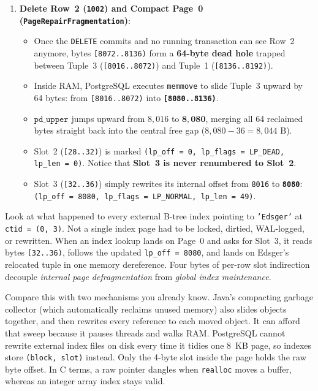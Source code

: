 \begin{enumerate}
  \item \textbf{Delete Row~2 (\texttt{1002}) and Compact Page~0 (\texttt{PageRepairFragmentation})}:
  \begin{itemize}
    \item Once the \texttt{DELETE} commits and no running transaction can see Row~2 anymore, bytes \texttt{[8072..8136)} form a \textbf{64-byte dead hole} trapped between Tuple~3 (\texttt{[8016..8072)}) and Tuple~1 (\texttt{[8136..8192)}).
    \item Inside RAM, PostgreSQL executes \texttt{memmove} to slide Tuple~3 upward by 64 bytes: from \texttt{[8016..8072)} into \textbf{\texttt{[8080..8136)}}.
    \item $\texttt{pd\_upper}$ jumps upward from $8{,}016$ to $\mathbf{8{,}080}$, merging all 64 reclaimed bytes straight back into the central free gap ($8{,}080 - 36 = 8{,}044\text{ B}$).
    \item Slot~2 (\texttt{[28..32)}) is marked \texttt{(lp\_off = 0, lp\_flags = LP\_DEAD, lp\_len = 0)}. Notice that \textbf{Slot~3 is never renumbered to Slot~2}.
    \item Slot~3 (\texttt{[32..36)}) simply rewrites its internal offset from \texttt{8016} to \textbf{\texttt{8080}}: \texttt{(lp\_off = 8080, lp\_flags = LP\_NORMAL, lp\_len = 49)}.
  \end{itemize}
\end{enumerate}

\begin{whybox}
Look at what happened to every external B-tree index pointing to \texttt{'Edsger'} at \texttt{ctid = (0, 3)}. Not a single index page had to be locked, dirtied, WAL-logged, or rewritten. When an index lookup lands on Page~0 and asks for Slot~3, it reads bytes \texttt{[32..36)}, follows the updated \texttt{lp\_off = 8080}, and lands on Edsger's relocated tuple in one memory dereference. Four bytes of per-row slot indirection decouple \emph{internal page defragmentation} from \emph{global index maintenance}.
\end{whybox}

Compare this with two mechanisms you already know. Java's compacting garbage collector (which automatically reclaims unused memory) also slides objects together, and then rewrites every reference to each moved object. It can afford that sweep because it pauses threads and walks RAM. PostgreSQL cannot rewrite external index files on disk every time it tidies one 8~KB page, so indexes store \texttt{(block, slot)} instead. Only the 4-byte slot inside the page holds the raw byte offset. In C terms, a raw pointer dangles when \texttt{realloc} moves a buffer, whereas an integer array index stays valid.


